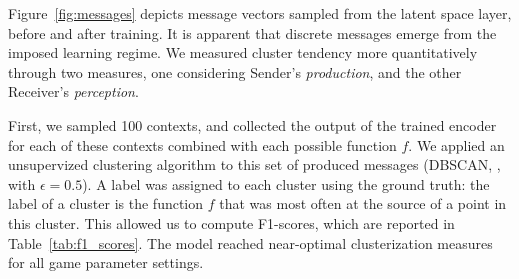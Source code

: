 \documentclass[11pt,a4paper]{article}
\begin{document}


Figure~\ref{fig:messages} depicts message vectors sampled from the latent space layer, before and after training. It is apparent that discrete messages emerge from the imposed learning regime. We measured cluster tendency more quantitatively through two measures, one considering Sender's \emph{production}, and the other Receiver's \emph{perception}. 

First, we sampled 100 contexts, and collected the output of the trained encoder for each of these contexts combined with each possible function $f$. We applied an unsupervized clustering algorithm to this set of produced messages (DBSCAN, \citealp{ester_density-based_1996}, with $\epsilon = 0.5$). A label was assigned to each cluster using the ground truth: the label of a cluster is the function $f$ that was most often at the source of a point in this cluster. This allowed us to compute F1-scores, which are reported in Table~\ref{tab:f1_scores}.
The model reached near-optimal clusterization measures for all game parameter settings.
\end{document}
